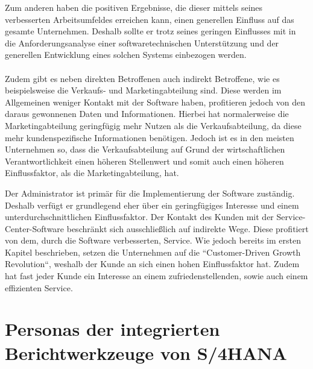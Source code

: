 \newpage
Zum anderen haben die positiven Ergebnisse, die dieser mittels seines verbesserten Arbeitsumfeldes erreichen kann, einen generellen Einfluss auf das gesamte Unternehmen. 
Deshalb sollte er trotz seines geringen Einflusses mit in die Anforderungsanalyse einer softwaretechnischen Unterstützung und der generellen Entwicklung eines solchen Systems einbezogen werden. \\
\\
Zudem gibt es neben direkten Betroffenen auch indirekt Betroffene, wie es beispielsweise die Verkaufs- und Marketingabteilung sind. Diese werden im Allgemeinen weniger Kontakt mit der Software haben, profitieren jedoch von den daraus gewonnenen Daten und Informationen. Hierbei hat normalerweise die Marketingabteilung geringfügig mehr Nutzen als die Verkaufsabteilung, da diese mehr kundenspezifische Informationen benötigen. Jedoch ist es in den meisten Unternehmen so, dass die Verkaufsabteilung auf Grund der wirtschaftlichen Verantwortlichkeit einen höheren Stellenwert und somit auch einen höheren Einflussfaktor, als die Marketingabteilung, hat. 

Der Administrator ist primär für die Implementierung der Software zuständig. Deshalb verfügt er grundlegend eher über ein geringfügiges Interesse und einem unterdurchschnittlichen Einflussfaktor. 
\newpage
Der Kontakt des Kunden mit der Service-Center-Software beschränkt sich ausschließlich auf indirekte Wege. Diese profitiert von dem, durch die Software verbesserten, Service. Wie jedoch bereits im ersten Kapitel beschrieben, setzen die Unternehmen auf die ``Customer-Driven Growth Revolution``, weshalb der Kunde an sich einen hohen Einflussfaktor hat. Zudem hat fast jeder Kunde ein Interesse an einem zufriedenstellenden, sowie auch einem effizienten Service. 
\section{Personas der integrierten Berichtwerkzeuge von S/4HANA}

